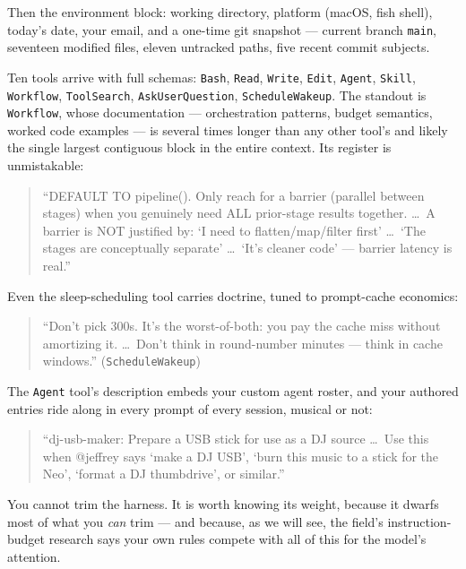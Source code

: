 \documentclass[11pt,letterpaper]{article}
\newenvironment{excerpt}{%
  \par\vspace{0.5em}%
  \begin{quote}\small\color{acdark}%
}{%
  \end{quote}\vspace{0.3em}\par%
}
\begin{document}
Then the environment block: working directory, platform (macOS, fish shell), today's date, your email, and a one-time git snapshot --- current branch \texttt{main}, seventeen modified files, eleven untracked paths, five recent commit subjects.

Ten tools arrive with full schemas: \texttt{Bash}, \texttt{Read}, \texttt{Write}, \texttt{Edit}, \texttt{Agent}, \texttt{Skill}, \texttt{Workflow}, \texttt{ToolSearch}, \texttt{AskUserQuestion}, \texttt{ScheduleWakeup}. The standout is \texttt{Workflow}, whose documentation --- orchestration patterns, budget semantics, worked code examples --- is several times longer than any other tool's and likely the single largest contiguous block in the entire context. Its register is unmistakable:

\begin{excerpt}
``DEFAULT TO pipeline(). Only reach for a barrier (parallel between stages) when you genuinely need ALL prior-stage results together. \ldots\ A barrier is NOT justified by: `I need to flatten/map/filter first' \ldots\ `The stages are conceptually separate' \ldots\ `It's cleaner code' --- barrier latency is real.''
\end{excerpt}

Even the sleep-scheduling tool carries doctrine, tuned to prompt-cache economics:

\begin{excerpt}
``Don't pick 300s. It's the worst-of-both: you pay the cache miss without amortizing it. \ldots\ Don't think in round-number minutes --- think in cache windows.'' (\texttt{ScheduleWakeup})
\end{excerpt}

The \texttt{Agent} tool's description embeds your custom agent roster, and your authored entries ride along in every prompt of every session, musical or not:

\begin{excerpt}
``dj-usb-maker: Prepare a USB stick for use as a DJ source \ldots\ Use this when @jeffrey says `make a DJ USB', `burn this music to a stick for the Neo', `format a DJ thumbdrive', or similar.''
\end{excerpt}

You cannot trim the harness. It is worth knowing its weight, because it dwarfs most of what you \textit{can} trim --- and because, as we will see, the field's instruction-budget research says your own rules compete with all of this for the model's attention.
\end{document}
